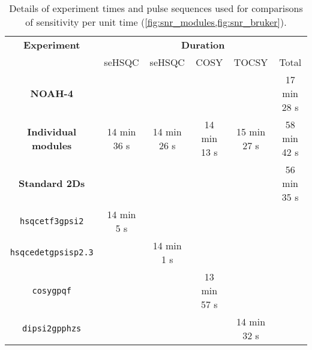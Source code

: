 { %
\renewcommand{\arraystretch}{1.1}
\begin{table}
    \centering
    \begin{tabular}{cccccc}
        \toprule
        \textbf{Experiment} & \multicolumn{5}{c}{\textbf{Duration}} \\
                            & \nitrogen{} seHSQC & \carbon{} seHSQC & COSY & TOCSY & Total \\
        \midrule
        \textbf{NOAH-4}             & & & & & 17 min 28 s \\
        \midrule
        \textbf{Individual modules} & 14 min 36 s & 14 min 26 s & 14 min 13 s & 15 min 27 s & 58 min 42 s \\
        \midrule
        \textbf{Standard 2Ds}       & & & & & 56 min 35 s \\
        \texttt{hsqcetf3gpsi2}      & 14 min 5 s \\
        \texttt{hsqcedetgpsisp2.3}  & & 14 min 1 s \\
        \texttt{cosygpqf}           & & & 13 min 57 s \\
        \texttt{dipsi2gpphzs}       & & & & 14 min 32 s \\
        \bottomrule
    \end{tabular}
    \caption{
        Details of experiment times and pulse sequences used for comparisons of sensitivity per unit time (\cref{fig:snr_modules,fig:snr_bruker}).
        \zolmi{}
    }
    \label{tbl:bruker_expts}
\end{table}
} %

\printbibliography[heading=bibintoc,title={References}]
